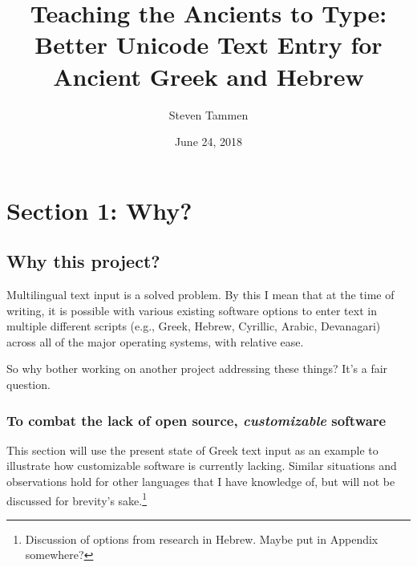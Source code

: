 \documentclass[11pt]{article}
\author{Steven Tammen}
\date{June 24, 2018}
\title{Teaching the Ancients to Type: Better Unicode Text Entry for Ancient Greek and Hebrew}
\begin{document}
\maketitle
\setcounter{tocdepth}{2}
\tableofcontents



\section{Section 1: Why?}
\label{sec:org21152d9}

\subsection{Why this project?}
\label{sec:orgb4f3eac}

Multilingual text input is a solved problem. By this I mean that at the time of writing, it is possible with various existing software options to enter text in multiple different scripts (e.g., Greek, Hebrew, Cyrillic, Arabic, Devanagari) across all of the major operating systems, with relative ease.

So why bother working on another project addressing these things? It's a fair question.

\subsubsection{To combat the lack of open source, \emph{customizable} software}
\label{sec:org41aeab0}

This section will use the present state of Greek text input as an example to illustrate how customizable software is currently lacking. Similar situations and observations hold for other languages that I have knowledge of, but will not be discussed for brevity's sake.\footnote{Discussion of options from research in Hebrew. Maybe put in Appendix somewhere?}
\end{document}
